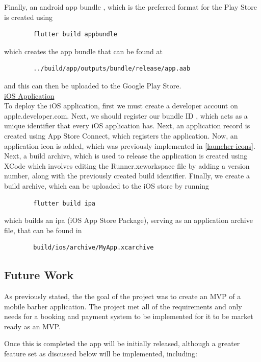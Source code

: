 \documentclass[12pt]{article}
\begin{document}
	Finally, an android app bundle \cite{androidAndroidAppBundle2021}, which is the preferred format for the Play Store is created using 
	\begin{lstlisting}
		flutter build appbundle
	\end{lstlisting}
	which creates the app bundle that can be found at 
	\begin{lstlisting}
		../build/app/outputs/bundle/release/app.aab
	\end{lstlisting}
	and this can then be uploaded to the Google Play Store.
	\\
	
	\noindent
	\underline{iOS Application}
	\\
	\noindent
	To deploy the iOS application, first we must create a developer account on apple.developer.com. Next, we should register our bundle ID \cite{appleBundleIDsApple2021}, which acts as a unique identifier that every iOS application has. Next, an application record is created using App Store Connect, which registers the application. Now, an application icon is added, which was previously implemented in \autoref{launcher-icons}. Next, a build archive, which is used to release the application is created using XCode which involves editing the Runner.xcworkspace file by adding a version number, along with the previously created build identifier.
	Finally, we create a build archive, which can be uploaded to the iOS store by running 
	\begin{lstlisting}
		flutter build ipa
	\end{lstlisting}
	which builds an ipa (iOS App Store Package), serving as an application archive file, that can be found in
	\begin{lstlisting}
		build/ios/archive/MyApp.xcarchive
	\end{lstlisting}
	
	
	\subsection{Future Work}
	
	As previously stated, the the goal of the project was to create an MVP of a mobile barber application. The project met all of the requirements and only needs for a booking and payment system to be implemented for it to be market ready as an MVP.
	
	Once this is completed the app will be initially released, although a greater feature set as discussed below will be implemented, including:
	
\end{document}
